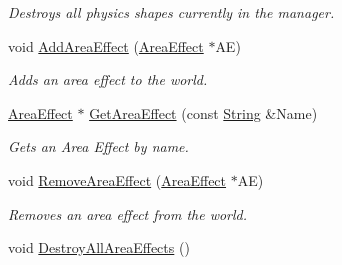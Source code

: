\begin{DoxyCompactItemize}
\begin{DoxyCompactList}\small\item\em Destroys all physics shapes currently in the manager. \item\end{DoxyCompactList}\item 
void \hyperlink{classphys_1_1PhysicsManager_a64e75a71598b6440c4feb1a2214a1420}{AddAreaEffect} (\hyperlink{classphys_1_1AreaEffect}{AreaEffect} $\ast$AE)
\begin{DoxyCompactList}\small\item\em Adds an area effect to the world. \item\end{DoxyCompactList}\item 
\hyperlink{classphys_1_1AreaEffect}{AreaEffect} $\ast$ \hyperlink{classphys_1_1PhysicsManager_a458b0649bee606aa6dd2d724135f1871}{GetAreaEffect} (const \hyperlink{namespacephys_aa03900411993de7fbfec4789bc1d392e}{String} \&Name)
\begin{DoxyCompactList}\small\item\em Gets an Area Effect by name. \item\end{DoxyCompactList}\item 
void \hyperlink{classphys_1_1PhysicsManager_a5ee0f784a8239be56164a7a67a28f227}{RemoveAreaEffect} (\hyperlink{classphys_1_1AreaEffect}{AreaEffect} $\ast$AE)
\begin{DoxyCompactList}\small\item\em Removes an area effect from the world. \item\end{DoxyCompactList}\item 
\hypertarget{classphys_1_1PhysicsManager_ac0157bc0c953b13162c680d1c49980f6}{
void \hyperlink{classphys_1_1PhysicsManager_ac0157bc0c953b13162c680d1c49980f6}{DestroyAllAreaEffects} ()}
\label{classphys_1_1PhysicsManager_ac0157bc0c953b13162c680d1c49980f6}


\end{DoxyCompactItemize}
